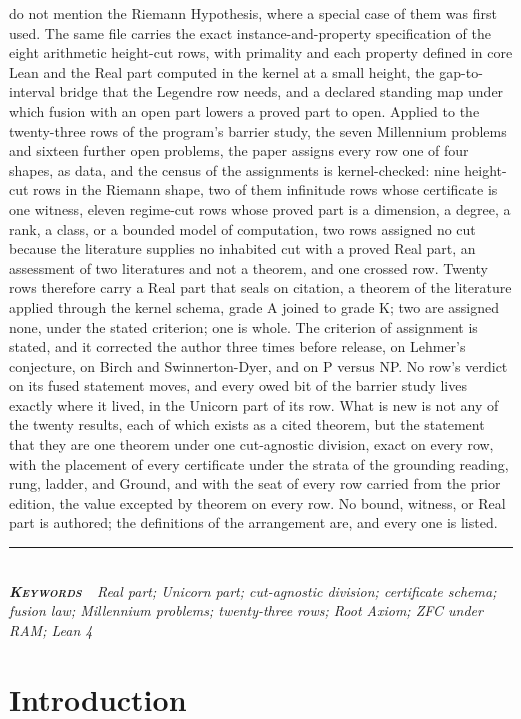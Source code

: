 \documentclass[10pt]{article}
\begin{document}
{\begin{minipage}{\textwidth}
{do not mention the Riemann Hypothesis, where a special case of them was
first used. The same file carries the exact instance-and-property
specification of the eight arithmetic height-cut rows, with primality
and each property defined in core Lean and the Real part computed in the
kernel at a small height, the gap-to-interval bridge that the Legendre
row needs, and a declared standing map under which fusion with an open
part lowers a proved part to open. Applied to the twenty-three rows of
the program's barrier study, the seven Millennium problems and sixteen
further open problems, the paper assigns every row one of four shapes,
as data, and the census of the assignments is kernel-checked: nine
height-cut rows in the Riemann shape, two of them infinitude rows whose
certificate is one witness, eleven regime-cut rows whose proved part is
a dimension, a degree, a rank, a class, or a bounded model of
computation, two rows assigned no cut because the literature supplies no
inhabited cut with a proved Real part, an assessment of two literatures
and not a theorem, and one crossed row. Twenty rows therefore carry a
Real part that seals on citation, a theorem of the literature applied
through the kernel schema, grade A joined to grade K; two are assigned
none, under the stated criterion; one is whole. The criterion of
assignment is stated, and it corrected the author three times before
release, on Lehmer's conjecture, on Birch and Swinnerton-Dyer, and on P
versus NP. No row's verdict on its fused statement moves, and every owed
bit of the barrier study lives exactly where it lived, in the Unicorn
part of its row. What is new is not any of the twenty results, each of
which exists as a cited theorem, but the statement that they are one
theorem under one cut-agnostic division, exact on every row, with the
placement of every certificate under the strata of the grounding
reading, rung, ladder, and Ground, and with the seat of every row
carried from the prior edition, the value excepted by theorem on every
row. No bound, witness, or Real part is authored; the definitions of the
arrangement are, and every one is listed.}\\[4pt]
{\color{accent}\rule{\textwidth}{0.6pt}}\\[3pt]
{\itshape\footnotesize\color{faint}\textbf{\upshape\scshape\color{deep}Keywords\ }\ Real
part; Unicorn part; cut-agnostic division; certificate schema; fusion
law; Millennium problems; twenty-three rows; Root Axiom; ZFC under RAM;
Lean 4}\\[12pt]
\end{minipage}
}
\thispagestyle{fancy}
\hypertarget{introduction}{%
\section{Introduction}\label{introduction}}
\end{document}
